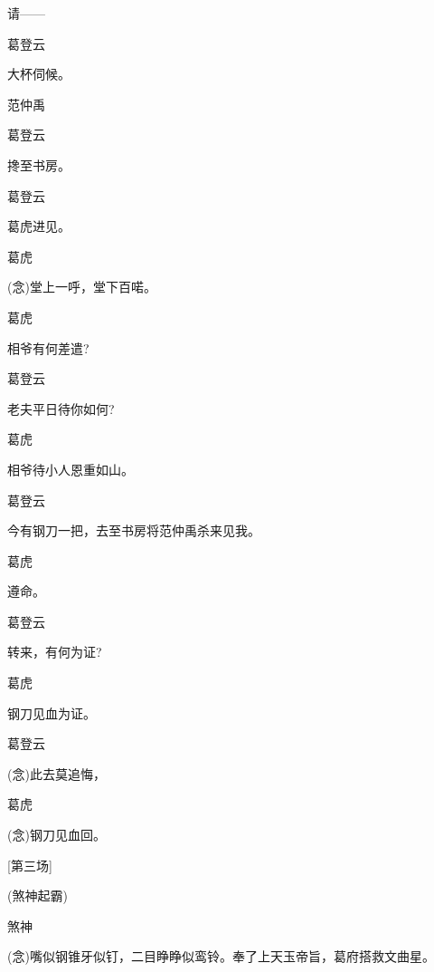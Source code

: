 请------

葛登云\hspace{20pt}~

大杯伺候。

范仲禹\hspace{20pt}~


葛登云\hspace{20pt}~

搀至书房。

葛登云\hspace{20pt}~

葛虎进见。

葛虎\hspace{30pt}~

({\akai 念})堂上一呼，堂下百喏。

葛虎\hspace{30pt}~

相爷有何差遣?

葛登云\hspace{20pt}~

老夫平日待你如何?

葛虎\hspace{30pt}~

相爷待小人恩重如山。

葛登云\hspace{20pt}~

今有钢刀一把，去至书房将范仲禹杀来见我。

葛虎\hspace{30pt}~

遵命。

葛登云\hspace{20pt}~

转来，有何为证?

葛虎\hspace{30pt}~

钢刀见血为证。

葛登云\hspace{20pt}~

({\akai 念})此去莫追悔，

葛虎\hspace{30pt}~

({\akai 念})钢刀见血回。

{{[}第三场{]}}

(煞神起霸)

煞神

({\akai 念})嘴似钢锥牙似钉，二目睁睁似鸾铃。奉了上天玉帝旨，葛府搭救文曲星。

